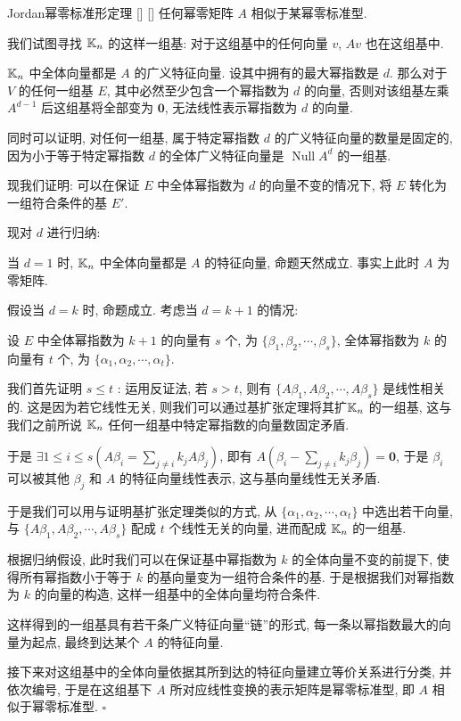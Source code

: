 \documentclass[UTF8]{ctexart}
\DeclareMathOperator{\0}{\mathbf{0}}
\DeclareMathOperator{\Null}{Null}
\DeclareMathOperator{\<}{\langle}
\renewcommand{\>}{\rangle}
\begin{document}
		\begin{thm}
			[]
			{Jordan幂零标准形定理}
			[]
			[]
			任何幂零矩阵 \(A\) 相似于某幂零标准型. 
		\end{thm}

		\begin{prf}

			我们试图寻找 \(\operatorname{\mathbb{K}}_n\) 的这样一组基: 对于这组基中的任何向量 \(v\),  \(Av\) 也在这组基中. 

			 \(\operatorname{\mathbb{K}}_n\) 中全体向量都是 \(A\) 的广义特征向量. 设其中拥有的最大幂指数是 \(d\). 那么对于 \(V\) 的任何一组基 \(E\), 其中必然至少包含一个幂指数为 \(d\) 的向量, 否则对该组基左乘 \(A^{d-1}\) 后这组基将全部变为 \(\mathbf{0}\), 无法线性表示幂指数为 \(d\) 的向量. 

			同时可以证明, 对任何一组基, 属于特定幂指数 \(d\) 的广义特征向量的数量是固定的, 因为小于等于特定幂指数 \(d\) 的全体广义特征向量是 \(\Null A^d\) 的一组基. 

			现我们证明: 可以在保证 \(E\) 中全体幂指数为 \(d\) 的向量不变的情况下, 将 \(E\) 转化为一组符合条件的基 \(E'\). 

			现对 \(d\) 进行归纳: 

			当 \(d=1\) 时,  \(\operatorname{\mathbb{K}}_n\) 中全体向量都是 \(A\) 的特征向量, 命题天然成立. 事实上此时 \(A\) 为零矩阵. 

			假设当 \(d=k\) 时, 命题成立. 考虑当 \(d=k+1\) 的情况: 
			
			设 \(E\) 中全体幂指数为 \(k+1\) 的向量有 \(s\) 个, 为 \(\{\beta_1,\beta_2,\cdots,\beta_s\}\), 全体幂指数为 \(k\) 的向量有 \(t\) 个, 为 \(\{\alpha_1,\alpha_2,\cdots,\alpha_t\}\). 

			我们首先证明 \(s\leq t\) : 运用反证法, 若 \(s>t\), 则有 \(\{A\beta_1,A\beta_2,\cdots, A\beta_s\}\) 是线性相关的. 这是因为若它线性无关, 则我们可以通过基扩张定理将其扩 \(\operatorname{\mathbb{K}}_n\) 的一组基, 这与我们之前所说 \(\operatorname{\mathbb{K}}_n\) 任何一组基中特定幂指数的向量数固定矛盾. 
			
			于是 \(\exists 1\leq i\leq s(A\beta_i =\sum\limits_{j\neq i}k_j A\beta_j)\), 即有 \(A(\beta_i-\sum\limits_{j\neq i}k_j \beta_j)=\mathbf{0}\), 于是 \(\beta_i\) 可以被其他 \(\beta_j\) 和 \(A\) 的特征向量线性表示, 这与基向量线性无关矛盾. 

			于是我们可以用与证明基扩张定理类似的方式, 从 \(\{\alpha_1,\alpha_2,\cdots,\alpha_t\}\) 中选出若干向量, 与 \(\{A\beta_1,A\beta_2,\cdots,A\beta_s\}\) 配成 \(t\) 个线性无关的向量, 进而配成 \(\operatorname{\mathbb{K}}_n\) 的一组基. 

			根据归纳假设, 此时我们可以在保证基中幂指数为 \(k\) 的全体向量不变的前提下, 使得所有幂指数小于等于 \(k\) 的基向量变为一组符合条件的基. 于是根据我们对幂指数为 \(k\) 的向量的构造, 这样一组基中的全体向量均符合条件. 

			这样得到的一组基具有若干条广义特征向量``链''的形式, 每一条以幂指数最大的向量为起点, 最终到达某个 \(A\) 的特征向量. 

			接下来对这组基中的全体向量依据其所到达的特征向量建立等价关系进行分类, 并依次编号, 于是在这组基下 \(A\) 所对应线性变换的表示矩阵是幂零标准型, 即 \(A\) 相似于幂零标准型.  \(\square\) 
		\end{prf}
\end{document}
